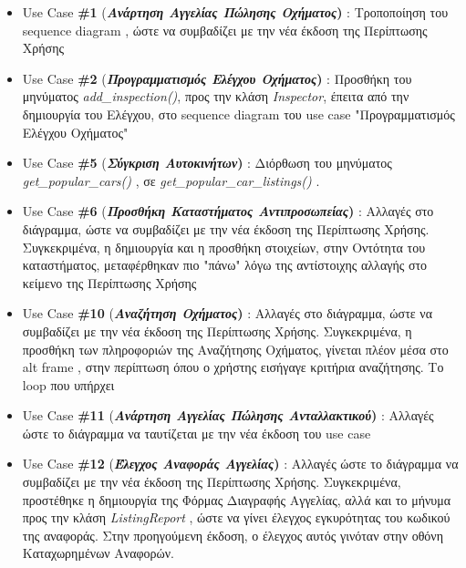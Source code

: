 \documentclass{../ol-softwaremanual}
\begin{document}
	\begin{itemize}
		\item \en Use Case  \textbf{\#1} (\gr \textbf{\textit{Ανάρτηση Αγγελίας Πώλησης Οχήματος}) }:  Τροποποίηση του \en sequence diagram \gr, ώστε να συμβαδίζει με την νέα έκδοση της Περίπτωσης Χρήσης	
		
		\item \en Use Case  \textbf{\#2} (\gr \textbf{\textit{Προγραμματισμός Ελέγχου Οχήματος}) }:  Προσθήκη του μηνύματος \en \textit{add\_inspection()}\gr, προς την κλάση \en \textit{Inspector}\gr, έπειτα από την δημιουργία του Ελέγχου, στο \en sequence diagram \gr του \en use case "\gr Προγραμματισμός Ελέγχου Οχήματος\en"\gr
		
		\item \en Use Case  \textbf{\#5} (\gr \textbf{\textit{Σύγκριση Αυτοκινήτων}) }:  Διόρθωση του μηνύματος \en\textit{get\_popular\_cars()} \gr, σε \en \textit{get\_popular\_car\_listings()} \gr.		
		
		
		\item \en Use Case  \textbf{\#6} (\gr \textbf{\textit{Προσθήκη Καταστήματος Αντιπροσωπείας}) }: Αλλαγές στο διάγραμμα, ώστε να συμβαδίζει με την νέα έκδοση της Περίπτωσης Χρήσης. Συγκεκριμένα, η δημιουργία και η προσθήκη στοιχείων, στην Οντότητα του καταστήματος, μεταφέρθηκαν πιο \en"\gr πάνω\en" \gr λόγω της αντίστοιχης αλλαγής στο κείμενο της Περίπτωσης Χρήσης 
		
		\item \en Use Case  \textbf{\#10} (\gr \textbf{\textit{Αναζήτηση Οχήματος}) }: Αλλαγές στο διάγραμμα, ώστε να συμβαδίζει με την νέα έκδοση της Περίπτωσης Χρήσης. Συγκεκριμένα, η προσθήκη των πληροφοριών της Αναζήτησης Οχήματος, γίνεται πλέον μέσα στο \en alt frame \gr, στην περίπτωση όπου ο χρήστης εισήγαγε κριτήρια αναζήτησης. Το \en loop \gr που υπήρχει 
		
		
		\item \en Use Case  \textbf{\#11} (\gr \textbf{\textit{Ανάρτηση Αγγελίας Πώλησης Ανταλλακτικού}) }: Αλλαγές ώστε το διάγραμμα να ταυτίζεται με την νέα έκδοση του \en use case \gr
		
		\item \en Use Case  \textbf{\#12} (\gr \textbf{\textit{Έλεγχος Αναφοράς Αγγελίας}) }: Αλλαγές ώστε το διάγραμμα να συμβαδίζει με την νέα έκδοση της Περίπτωσης Χρήσης. Συγκεκριμένα, προστέθηκε η δημιουργία της Φόρμας Διαγραφής Αγγελίας, αλλά και το μήνυμα προς την κλάση \en \textit{ListingReport} \gr, ώστε να γίνει έλεγχος εγκυρότητας του κωδικού της αναφοράς. Στην προηγούμενη έκδοση, ο έλεγχος αυτός γινόταν στην οθόνη Καταχωρημένων Αναφορών.
		

\end{itemize}
\end{document}
